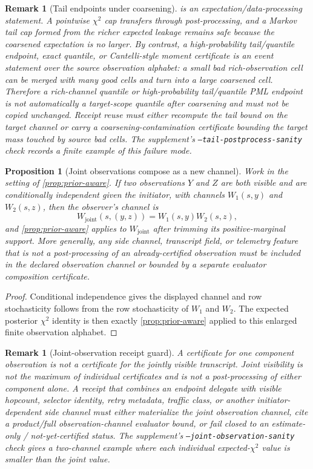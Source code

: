 \documentclass[11pt]{article}
\newtheorem{proposition}[theorem]{Proposition}
\newtheorem{remark}[theorem]{Remark}
\begin{document}
\begin{remark}[Tail endpoints under coarsening]\label{rem:tail-coarsening}
 is an expectation/data-processing statement.  A
pointwise $\chi^2$ cap transfers through post-processing, and a Markov tail cap
formed from the richer expected leakage remains safe because the coarsened
expectation is no larger.  By contrast, a high-probability tail/quantile endpoint, exact quantile, or
Cantelli-style moment certificate is an event statement over the source
observation alphabet: a small bad rich-observation cell can be merged with many
good cells and turn into a large coarsened cell.  Therefore a rich-channel
quantile or high-probability tail/quantile PML endpoint is not automatically a target-scope quantile after coarsening and must not be copied unchanged.  Receipt
reuse must either recompute the tail bound on the target channel or carry a
coarsening-contamination certificate bounding the target mass touched by source
bad cells.  The supplement's \texttt{--tail-postprocess-sanity} check records a
finite example of this failure mode.
\end{remark}



\begin{proposition}[Joint observations compose as a new channel]\label{prop:joint-observation}
Work in the setting of \cref{prop:prior-aware}.  If two observations $Y$ and
$Z$ are both visible and are conditionally independent given the initiator, with
channels $W_1(s,y)$ and $W_2(s,z)$, then the observer's channel is
\[
W_{\mathrm{joint}}(s,(y,z))=W_1(s,y)W_2(s,z),
\]
and \cref{prop:prior-aware} applies to $W_{\mathrm{joint}}$ after trimming its
positive-marginal support.  More generally, any side channel, transcript field,
or telemetry feature that is not a post-processing of an already-certified
observation must be included in the declared observation channel or bounded by a
separate evaluator composition certificate.
\end{proposition}
\begin{proof}
Conditional independence gives the displayed channel and row stochasticity follows
from the row stochasticity of $W_1$ and $W_2$.  The expected posterior $\chi^2$
identity is then exactly \cref{prop:prior-aware} applied to this enlarged finite
observation alphabet.
\end{proof}

\begin{remark}[Joint-observation receipt guard]
A certificate for one component observation is not a certificate for the jointly
visible transcript.  Joint visibility is not the maximum of individual certificates
and is not a post-processing of either component alone.  A receipt that combines
an endpoint delegate with visible hopcount, selector identity, retry metadata,
traffic class, or another initiator-dependent side channel must either materialize
the joint observation channel, cite a product/full observation-channel evaluator
bound, or fail closed to an estimate-only / not-yet-certified status.
The supplement's \texttt{--joint-observation-sanity} check gives a two-channel
example where each individual expected-$\chi^2$ value is smaller than the joint
value.
\end{remark}
\end{document}
